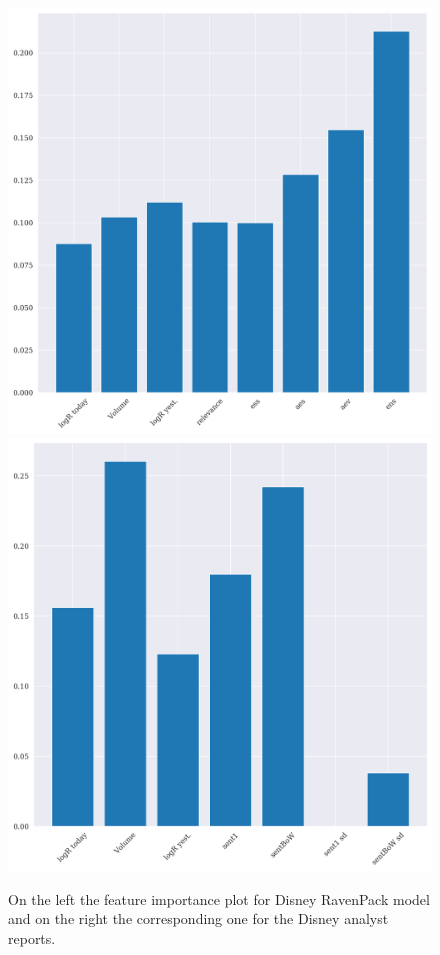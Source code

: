 \begin{figure}[h!]
    \centering
    \begin{adjustbox}{width=.95\textwidth,center}
        \includegraphics[width = \linewidth]{figures/XGBoostRav_tomorrow_iterative.png}
        \includegraphics[width = \linewidth]{figures/XGBoostSent_tomorrow_iterative.png}
    \end{adjustbox}  
    \caption{On the left the feature importance plot for Disney RavenPack model and on the right the corresponding one for the Disney analyst reports.}
    \label{fig:VIP}
\end{figure}



